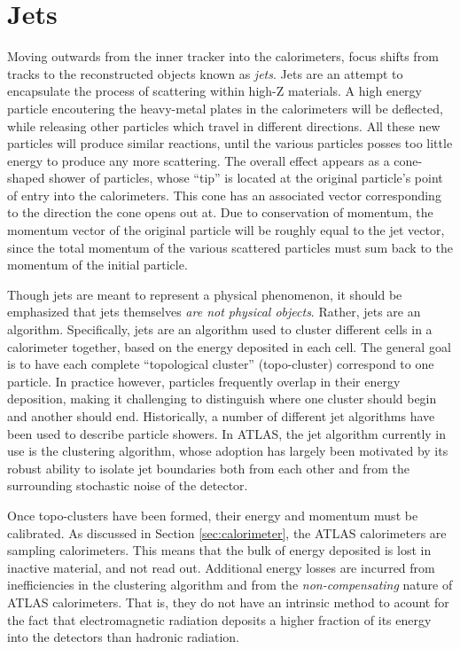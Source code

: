     \section{Jets}
        Moving outwards from the inner tracker into the calorimeters, focus shifts from tracks to the reconstructed objects known as \textit{jets}.
        Jets are an attempt to encapsulate the process of scattering within high-Z materials.
        A high energy particle encoutering the heavy-metal plates in the calorimeters will be deflected,
            while releasing other particles which travel in different directions.
        All these new particles will produce similar reactions, until the various particles posses too little energy to produce any more scattering.
        The overall effect appears as a cone-shaped shower of particles,
            whose ``tip'' is located at the original particle's point of entry into the calorimeters.
        This cone has an associated vector corresponding to the direction the cone opens out at.
        Due to conservation of momentum, the momentum vector of the original particle will be roughly equal to the jet vector,
            since the total momentum of the various scattered particles must sum back to the momentum of the initial particle.

        Though jets are meant to represent a physical phenomenon,
            it should be emphasized that jets themselves \textit{are not physical objects}.
        Rather, jets are an algorithm.
        Specifically, jets are an algorithm used to cluster different cells in a calorimeter together,
            based on the energy deposited in each cell.
        The general goal is to have each complete ``topological cluster'' (topo-cluster) correspond to one particle.
        In practice however, particles frequently overlap in their energy deposition,
            making it challenging to distinguish where one cluster should begin and another should end.
        Historically, a number of different jet algorithms have been used to describe particle showers.
        In ATLAS, the jet algorithm currently in use is the \textit{\antikt} clustering algorithm\cite{anti_kt},
            whose adoption has largely been motivated by its robust ability to isolate jet boundaries both from each other
            and from the surrounding stochastic noise of the detector.

        Once topo-clusters have been formed, their energy and momentum must be calibrated.
        As discussed in Section \ref{sec:calorimeter}, the ATLAS calorimeters are sampling calorimeters.
        This means that the bulk of energy deposited is lost in inactive material, and not read out.
        Additional energy losses are incurred from inefficiencies in the clustering algorithm and from the \textit{non-compensating} nature of ATLAS calorimeters.
        That is, they do not have an intrinsic method to acount for the fact that electromagnetic radiation deposits a higher fraction of its energy into the detectors than hadronic radiation.
        \cite{cell_clustering}
        

